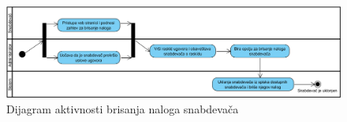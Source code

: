 \begin{figure}[H]
\begin{center}
\includegraphics[width=\textwidth]{Pictures/activity_supplier_delete.png}
\end{center}
    \caption{Dijagram aktivnosti brisanja naloga snabdevača}
\label{fig:ActivitySupplierContractTermination1}
\end{figure}